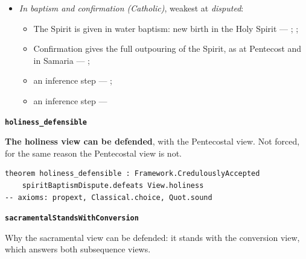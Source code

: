 \documentclass[11pt]{article}
\begin{document}
\begin{itemize}
\begin{itemize}
\item an inference step --- \cite{menzies-lukes-understanding-2017}; \cite{menzies-empowered-witness-1994}
\end{itemize}
\item \emph{In baptism and confirmation (Catholic)}, weakest at \emph{disputed}:
\begin{itemize}
\item The Spirit is given in water baptism: new birth in the Holy Spirit --- \cite[1262]{catholic-church-catechism-2000}; \cite[1265]{catholic-church-catechism-2000}; \cite[Small Catechism, Baptism, third part]{kolb-wengert-book-of-concord-2000}
\item Confirmation gives the full outpouring of the Spirit, as at Pentecost and in Samaria --- \cite[1302]{catholic-church-catechism-2000}; \cite[1288]{catholic-church-catechism-2000}
\item an inference step --- \cite[1302]{catholic-church-catechism-2000}; \cite[XXVIII.6]{westminster-confession-1647}
\item an inference step --- \cite[1302]{catholic-church-catechism-2000}
\end{itemize}
\end{itemize}
\par\medskip\noindent\textbf{\texttt{holiness\_\allowbreak{}defensible}}\par\nobreak\noindent
\textbf{The holiness view can be defended}, with the Pentecostal view. Not forced, for the same reason the Pentecostal view is not.

{\small\begin{verbatim}
theorem holiness_defensible : Framework.CredulouslyAccepted
    spiritBaptismDispute.defeats View.holiness
-- axioms: propext, Classical.choice, Quot.sound
\end{verbatim}}
\par\medskip\noindent\textbf{\texttt{sacramental\allowbreak{}Stands\allowbreak{}With\allowbreak{}Conversion}}\par\nobreak\noindent
Why the sacramental view can be defended: it stands with the conversion view, which answers both subsequence views.
\end{document}
